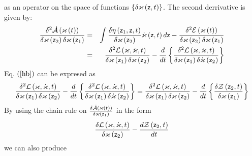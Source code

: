 as an operator on the space of functions $\left\{ \delta \varkappa \left( 
{\sf z},t\right) \right\} $. The second derrivative is given by: 
\begin{eqnarray}
\frac{\delta ^{2}{\cal \dot{A}}\left( \varkappa \left( t\right) \right) }{%
\delta \varkappa \left( {\sf z}_{2}\right) \delta \varkappa \left( {\sf z}%
_{1}\right) } &=&\int \frac{\delta \eta \left( {\sf z}_{1},{\sf z},t\right) 
}{\delta \varkappa \left( {\sf z}_{2}\right) }{\cal \dot{\varkappa}}\left( 
{\sf z},t\right) d{\sf z}-\frac{\delta ^{2}{\cal E}\left( {\cal \varkappa }%
\left( t\right) \right) }{\delta \varkappa \left( {\sf z}_{2}\right) \delta
\varkappa \left( {\sf z}_{1}\right) }  \label{ha} \\
&=&\frac{\delta ^{2}{\cal L}\left( {\cal \varkappa },{\cal \dot{\varkappa}}%
,t\right) }{\delta \varkappa \left( {\sf z}_{1}\right) \delta \varkappa
\left( {\sf z}_{2}\right) }-\frac{d}{dt}\left\{ \frac{\delta ^{2}{\cal L}%
\left( \varkappa ,\dot{\varkappa},t\right) }{\delta \varkappa \left( {\sf z}%
_{1}\right) \delta \dot{\varkappa}\left( {\sf z}_{2}\right) }\right\}
\label{hb}
\end{eqnarray}%
Eq. $\left( \ref{hb}\right) $ can be expresed as 
\begin{equation}
\frac{\delta ^{2}{\cal L}\left( {\cal \varkappa },{\cal \dot{\varkappa}}%
,t\right) }{\delta \varkappa \left( {\sf z}_{1}\right) \delta \varkappa
\left( {\sf z}_{2}\right) }-\frac{d}{dt}\left\{ \frac{\delta ^{2}{\cal L}%
\left( \varkappa ,\dot{\varkappa},t\right) }{\delta \varkappa \left( {\sf z}%
_{1}\right) \delta \dot{\varkappa}\left( {\sf z}_{2}\right) }\right\} =\frac{%
\delta ^{2}{\cal L}\left( {\cal \varkappa },{\cal \dot{\varkappa}},t\right) 
}{\delta \varkappa \left( {\sf z}_{1}\right) \delta \varkappa \left( {\sf z}%
_{2}\right) }-\frac{d}{dt}\left\{ \frac{\delta {\cal Z}\left( {\sf z}%
_{2},t\right) }{\delta \varkappa \left( {\sf z}_{1}\right) }\right\}
\end{equation}%
By using the chain rule on $\frac{\delta {\cal \dot{A}}\left( \varkappa
\left( t\right) \right) }{\delta \varkappa \left( {\sf z}_{1}\right) }$ in
the form 
\begin{equation}
\frac{\delta {\cal L}\left( {\cal \varkappa },{\cal \dot{\varkappa}}%
,t\right) }{\delta {\cal \varkappa }\left( {\sf z}_{2}\right) }-\frac{d{\cal %
Z}\left( {\sf z}_{2},t\right) }{dt}
\end{equation}%
we can also produce 
